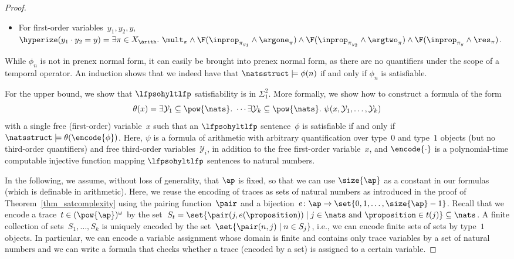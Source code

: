 \begin{proof}
\begin{itemize}
    \item For first-order variables~$y_1,y_2,y$, $\hyperize(y_1 \cdot y_2=y) = \exists \pi \in X_\arith.\ \mult_\pi \land \F(\inprop_{\pi_{y_1}}\land\argone_\pi) \land \F(\inprop_{\pi_{y_2}}\land\argtwo_\pi) \land \F(\inprop_{\pi_y}\land\res_\pi)$.
    
\end{itemize}
While $\phi_n$ is not in prenex normal form, it can easily be brought into prenex normal form, as there are no quantifiers under the scope of a temporal operator.
An induction shows that we indeed have that $\natsstruct\models\phi(n)$ if and only if $\phi_n$ is satisfiable.
    
For the upper bound, we show that $\lfpsohyltlfp$ satisfiability is in $\Sigma_1^2$. More formally, we show how to construct a formula of the form
\[
\theta(x) = \exists \mathcal{Y}_1\subseteq \pow{\nats}.\ \cdots \exists \mathcal{Y}_k\subseteq \pow{\nats}. \ \psi(x, \mathcal{Y}_1, \ldots,\mathcal{Y}_k)
\]
with a single free (first-order) variable~$x$ such that an $\lfpsohyltlfp$ sentence~$\phi$ is satisfiable if and only if $\natsstruct \models \theta(\encode{\phi})$.
Here, $\psi$ is a formula of arithmetic with arbitrary quantification over type~$0$ and type~$1$ objects (but no third-order quantifiers) and free third-order variables~$\mathcal{Y}_i$, in addition to the free first-order variable~$x$, and $\encode{\cdot}$ is a polynomial-time computable injective function mapping $\lfpsohyltlfp$ sentences to natural numbers.

In the following, we assume, without loss of generality, that $\ap$ is fixed, so that we can use $\size{\ap}$ as a constant in our formulas (which is definable in arithmetic). 
Here, we reuse the encoding of traces as sets of natural numbers as introduced in the proof of Theorem~\ref{thm_satcomplexity} using the pairing function~$\pair$ and a bijection~$e \colon \ap \rightarrow\set{0,1,\ldots,\size{\ap}-1}$.
Recall that we encode a trace~$t \in (\pow{\ap})^\omega$ by the set~$S_t =\set{\pair(j,e(\proposition)) \mid j \in \nats \text{ and } \proposition \in t(j)} \subseteq \nats$.
A finite collection of sets~$S_1, \ldots, S_k$ is uniquely encoded by the set~$\set{\pair(n,j) \mid n \in S_j}$, i.e., we can encode finite sets of sets by type~$1$ objects.
In particular, we can encode a variable assignment whose domain is finite and contains only trace variables by a set of natural numbers and we can write a  formula that checks whether a trace (encoded by a set) is assigned to a certain variable.


\end{proof}
